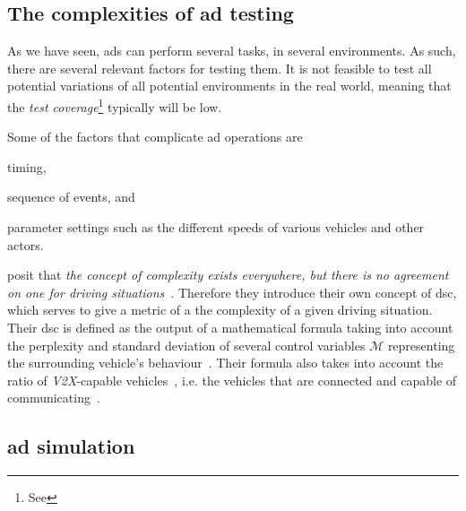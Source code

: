 \subsection{The complexities of \acrshort{ad} testing}\label{sec:adsTestingComplexity}

As we have seen, \acrshort{ads} can perform several tasks, in several environments. As such, there
are several relevant factors for testing them. It is not feasible to test all potential variations
of all potential environments in the real world, meaning that the \textit{test
    coverage}\footnote{See } typically will be low.

Some of the factors that complicate \acrshort{ad} operations are \begin{inparaenum}
    \item timing,
    \item sequence of events, and
    \item parameter settings such as the different speeds of various vehicles and other actors.
\end{inparaenum}

\citeauthor{adsComplexityIndex18} posit that \textit{the concept of complexity exists everywhere,
    but there is no agreement on one for driving situations}~\cite[1182]{adsComplexityIndex18}.
Therefore they introduce their own concept of \acrfull{dsc}, which serves to give a metric of a
the complexity of a given driving situation. Their \acrshort{dsc} is defined as the output of a
mathematical formula taking into account the perplexity and standard deviation of several
control variables $\mathcal{M}$ representing the surrounding vehicle's
behaviour~\cite[1182]{adsComplexityIndex18}. Their formula also takes into account the ratio of
\textit{V2X}-capable vehicles~\cite[1182]{adsComplexityIndex18}, i.e. the vehicles that are
connected and capable of communicating~\cite[1]{v2xTestingSurvey2019}.


\subsection{\acrlong{ad} simulation}


